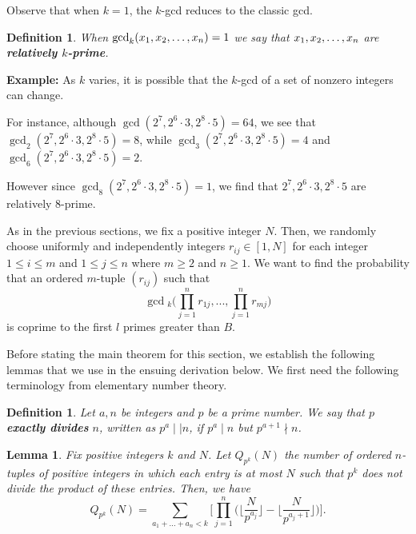 \documentclass[12pt]{amsart}
\newtheorem{lemma}[theorem]{Lemma}
\newtheorem{definition}[theorem]{Definition}
\theoremstyle{definition}
\begin{document}
\noindent Observe that when $k=1$, the $k$-gcd reduces to the classic gcd.

\begin{definition} When $\gcd_k(x_1,x_2,\mathellipsis,x_n)=1$ we say that  $x_1,x_2,\mathellipsis,x_n$ are \textbf{relatively $k$-prime}.
\end{definition}

\noindent \textbf{Example:}
As $k$ varies, it is possible that the $k$-gcd of a set of nonzero integers can change. 

\noindent For instance, although $\gcd(2^7, 2^6 \cdot 3, 2^8 \cdot 5) = 64$, we see that $\gcd_2(2^7, 2^6 \cdot 3, 2^8 \cdot 5)=8$, while $\gcd_3(2^7, 2^6 \cdot 3, 2^8 \cdot 5)=4$ and $\gcd_6(2^7, 2^6 \cdot 3, 2^8 \cdot 5) = 2$. 

\noindent However since $\gcd_8(2^7, 2^6 \cdot 3, 2^8 \cdot 5) = 1$, we find that $2^7, 2^6 \cdot 3, 2^8 \cdot 5$ are relatively $8$-prime.

As in the previous sections, we fix a positive integer $N$. Then, we randomly choose uniformly and independently integers $r_{ij} \in [1, N]$ for each integer $1 \leq i \leq m$ and $1 \leq j \leq n$ where $m \geq 2$ and $n \geq 1$. We want to find the probability that an ordered $m$-tuple $(r_{ij})$ such that 
$$\gcd{}_k\Big(\prod_{j=1}^nr_{1j}, ..., \prod_{j=1}^n r_{mj}\Big)$$
is coprime to the first $l$ primes greater than $B$. 

Before stating the main theorem for this section, we establish the following lemmas that we use in the ensuing derivation below. We first need the following terminology from elementary number theory.

\begin{definition}
	Let $a, n$ be integers and $p$ be a prime number. We say that $p$ \textbf{exactly divides} $n$, written as $p^a \mid \mid n$, if $p^a \mid n$ but $p^{a+1} \nmid n$. 
\end{definition}

\begin{lemma}
	Fix positive integers $k$ and $N$. Let $Q_{p^k}(N)$ the number of ordered $n$-tuples of positive integers in which each entry is at most $N$ such that $p^k$ does not divide the product of these entries. Then, we have
	$$Q_{p^k}(N) = \sum_{a_1+...+a_n < k} \Big[\prod_{j=1}^n \Big(\Big\lfloor \frac{N}{p^{a_j}}\Big\rfloor - \Big\lfloor \frac{N}{p^{a_j + 1}}\Big\rfloor\Big)\Big].$$
\end{lemma}
\end{document}
